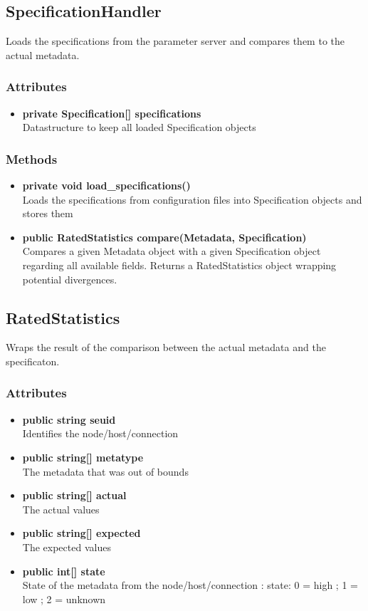 \subsection{SpecificationHandler}
Loads the specifications from the parameter server and compares them to the actual metadata.

\subsubsection{Attributes}
\begin{itemize}
	\item \textbf{private Specification[] specifications}\\
	Datastructure to keep all loaded Specification objects
\end{itemize}
\subsubsection{Methods}
\begin{itemize}
	\item \textbf{private void load\_specifications()}\\
	Loads the specifications from configuration files into Specification objects and stores them
	\item \textbf{public RatedStatistics compare(Metadata, Specification)}\\
	Compares a given Metadata object with a given Specification object regarding all available fields. Returns a RatedStatistics object wrapping potential divergences.
\end{itemize}


\subsection{RatedStatistics}
Wraps the result of the comparison between the actual metadata and the specificaton.

\subsubsection{Attributes}
\begin{itemize}
	\item \textbf{public string seuid}\\
	Identifies the node/host/connection
	\item \textbf{public string[] metatype}\\
	The metadata that was out of bounds
	\item \textbf{public string[] actual}\\
	The actual values
	\item \textbf{public string[] expected}\\
	The expected values
	\item \textbf{public int[] state}\\
	State of the metadata from the node/host/connection : state: { 0 = high ; 1 = low ; 2 = unknown}
\end{itemize}


